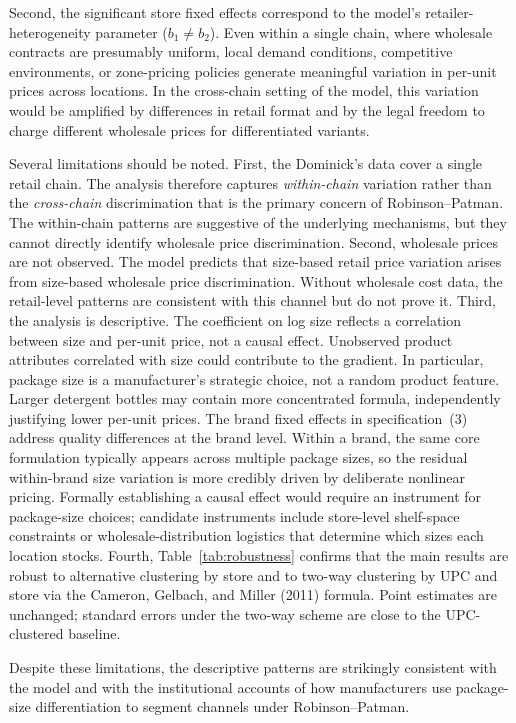 \documentclass[12pt]{article}
\theoremstyle{definition}
\begin{document}
Second, the significant store fixed effects correspond to the model's retailer-heterogeneity parameter ($b_1 \ne b_2$).
Even within a single chain, where wholesale contracts are presumably uniform, local demand conditions, competitive environments, or zone-pricing policies generate meaningful variation in per-unit prices across locations.
In the cross-chain setting of the model, this variation would be amplified by differences in retail format and by the legal freedom to charge different wholesale prices for differentiated variants.

Several limitations should be noted.
First, the Dominick's data cover a single retail chain. The analysis therefore captures \textit{within-chain} variation rather than the \textit{cross-chain} discrimination that is the primary concern of Robinson--Patman.
The within-chain patterns are suggestive of the underlying mechanisms, but they cannot directly identify wholesale price discrimination.
Second, wholesale prices are not observed.
The model predicts that size-based retail price variation arises from size-based wholesale price discrimination. Without wholesale cost data, the retail-level patterns are consistent with this channel but do not prove it.
Third, the analysis is descriptive.
The coefficient on log size reflects a correlation between size and per-unit price, not a causal effect.
Unobserved product attributes correlated with size could contribute to the gradient.
In particular, package size is a manufacturer's strategic choice, not a random product feature. Larger detergent bottles may contain more concentrated formula, independently justifying lower per-unit prices. The brand fixed effects in specification~(3) address quality differences at the brand level. Within a brand, the same core formulation typically appears across multiple package sizes, so the residual within-brand size variation is more credibly driven by deliberate nonlinear pricing. Formally establishing a causal effect would require an instrument for package-size choices; candidate instruments include store-level shelf-space constraints or wholesale-distribution logistics that determine which sizes each location stocks.
Fourth, Table~\ref{tab:robustness} confirms that the main results are robust to alternative clustering by store and to two-way clustering by UPC and store via the Cameron, Gelbach, and Miller (2011) formula. Point estimates are unchanged; standard errors under the two-way scheme are close to the UPC-clustered baseline.

Despite these limitations, the descriptive patterns are strikingly consistent with the model and with the institutional accounts of how manufacturers use package-size differentiation to segment channels under Robinson--Patman.
\end{document}

